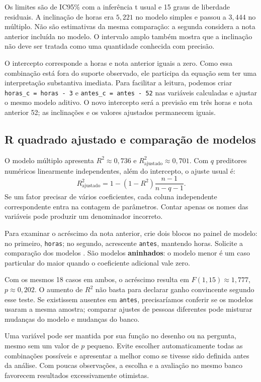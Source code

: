 Os limites são de IC95\% com a inferência t usual e 15 graus de liberdade residuais. A inclinação de horas era $5{,}221$ no modelo simples e passou a $3{,}444$ no múltiplo. Não são estimativas da mesma comparação: a segunda considera a nota anterior incluída no modelo. O intervalo amplo também mostra que a inclinação não deve ser tratada como uma quantidade conhecida com precisão.

O intercepto corresponde a horas e nota anterior iguais a zero. Como essa combinação está fora do suporte observado, ele participa da equação sem ter uma interpretação substantiva imediata. Para facilitar a leitura, podemos criar \texttt{horas\_c = horas - 3} e \texttt{antes\_c = antes - 52} nas variáveis calculadas e ajustar o mesmo modelo aditivo. O novo intercepto será a previsão em três horas e nota anterior 52; as inclinações e os valores ajustados permanecem iguais.

\subsection{R quadrado ajustado e comparação de modelos}

O modelo múltiplo apresenta $R^2\approx0{,}736$ e $R^2_{\mathrm{ajustado}}\approx0{,}701$. Com $q$ preditores numéricos linearmente independentes, além do intercepto, o ajuste usual é:
\[
R^2_{\mathrm{ajustado}}=
1-(1-R^2)\frac{n-1}{n-q-1}.
\]
Se um fator precisar de vários coeficientes, cada coluna independente correspondente entra na contagem de parâmetros. Contar apenas os nomes das variáveis pode produzir um denominador incorreto.

Para examinar o acréscimo da nota anterior, crie dois blocos no painel de modelo: no primeiro, \texttt{horas}; no segundo, acrescente \texttt{antes}, mantendo horas. Solicite a comparação dos modelos \parencite{JamoviRegressao}. São modelos \textbf{aninhados}: o modelo menor é um caso particular do maior quando o coeficiente adicional vale zero.

Com os mesmos 18 casos em ambos, o acréscimo resulta em $F(1,15)\approx1{,}777$, $p\approx0{,}202$. O aumento de $R^2$ não basta para declarar ganho convincente segundo esse teste. Se existissem ausentes em \texttt{antes}, precisaríamos conferir se os modelos usaram a mesma amostra; comparar ajustes de pessoas diferentes pode misturar mudanças do modelo e mudanças do banco.

Uma variável pode ser mantida por sua função no desenho ou na pergunta, mesmo sem um valor de $p$ pequeno. Evite escolher automaticamente todas as combinações possíveis e apresentar a melhor como se tivesse sido definida antes da análise. Com poucas observações, a escolha e a avaliação no mesmo banco favorecem resultados excessivamente otimistas.


